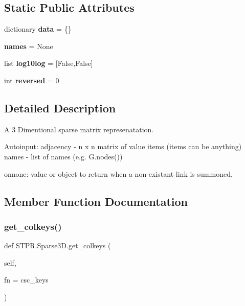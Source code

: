 \subsection*{Static Public Attributes}
\begin{DoxyCompactItemize}
\item 
\mbox{\label{classSTPR_1_1Sparse3D_a4905544c130463ee391a22c9c1e69d6e}} 
dictionary {\bfseries data} = \{\}
\item 
\mbox{\label{classSTPR_1_1Sparse3D_a350a4fbe483261f8245dc588fb542b0e}} 
{\bfseries names} = None
\item 
\mbox{\label{classSTPR_1_1Sparse3D_a58a0ecc49680c6d7c2b8f8fae034fb9c}} 
list {\bfseries log10log} = \mbox{[}False,False\mbox{]}
\item 
\mbox{\label{classSTPR_1_1Sparse3D_aaaca2c2b88e34b2259c38feccaf23f8e}} 
int {\bfseries reversed} = 0
\end{DoxyCompactItemize}


\subsection{Detailed Description}
\begin{DoxyVerb}A 3 Dimentional sparse matrix represenatation.

Autoinput:
    adjacency - n x n matrix of value items (items can be anything)
    names - list of names (e.g. G.nodes())

onnone:
    value or object to return when a non-existant link is summoned.
\end{DoxyVerb}
 

\subsection{Member Function Documentation}
\mbox{\label{classSTPR_1_1Sparse3D_a8d672996a1916e3d660778962c20bfcf}} 
\subsubsection{\texorpdfstring{get\+\_\+colkeys()}{get\_colkeys()}}
{\footnotesize\ttfamily def S\+T\+P\+R.\+Sparse3\+D.\+get\+\_\+colkeys (\begin{DoxyParamCaption}\item[{}]{self,  }\item[{}]{fn = {\ttfamily \textquotesingle{}csc\+\_\+keys\textquotesingle{}} }\end{DoxyParamCaption})}

